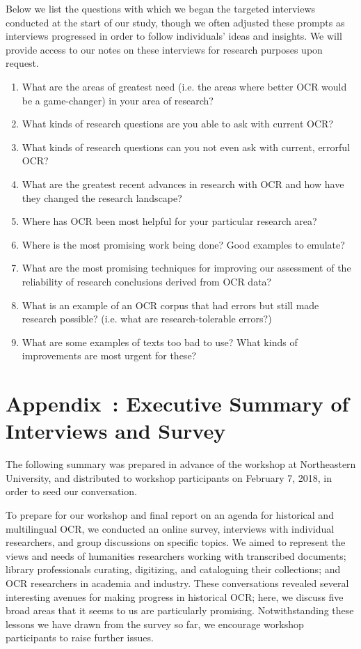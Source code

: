 \documentclass[twoside,11pt]{report}
\newcounter{appcounter}
\renewcommand{\theappcounter}{\Alph{appcounter}}
\renewcommand{\appendix}[2]{\refstepcounter{appcounter}%
  \label{app:#1}%
  \section{Appendix~\theappcounter: #2}%
  \label{sec:app-#1}}
\begin{document}
Below we list the questions with which we began the targeted interviews conducted at the start of our study, though we often adjusted these prompts as interviews progressed in order to follow individuals' ideas and insights. We will provide access to our notes on these interviews for research purposes upon request.
\begin{enumerate}

\item What are the areas of greatest need (i.e. the areas where better OCR would be a game-changer) in your area of research?

\item What kinds of research questions are you able to ask with current OCR?

\item What kinds of research questions can you not even ask with current, errorful OCR?

\item What are the greatest recent advances in research with OCR and how have they changed the research landscape?

\item Where has OCR been most helpful for your particular research area?

\item Where is the most promising work being done? Good examples to emulate?

\item What are the most promising techniques for improving our assessment of the reliability of research conclusions derived from OCR data?

\item What is an example of an OCR corpus that had errors but still made research possible? (i.e. what are research-tolerable errors?)

\item What are some examples of texts too bad to use? What kinds of improvements are most urgent for these?

\end{enumerate}

\appendix{exec-summary}{Executive Summary of Interviews and Survey}

The following summary was prepared in advance of the workshop at Northeastern University, and distributed to workshop participants on February 7, 2018, in order to seed our conversation.

To prepare for our workshop and final report on an agenda for historical and multilingual OCR, we conducted an online survey, interviews with individual researchers, and group discussions on specific topics. We aimed to represent the views and needs of humanities researchers working with transcribed documents; library professionals curating, digitizing, and cataloguing their collections; and OCR researchers in academia and industry. These conversations revealed several interesting avenues for making progress in historical OCR; here, we discuss five broad areas that it seems to us are particularly promising. Notwithstanding these lessons we have drawn from the survey so far, we encourage workshop participants to raise further issues.
\end{document}
